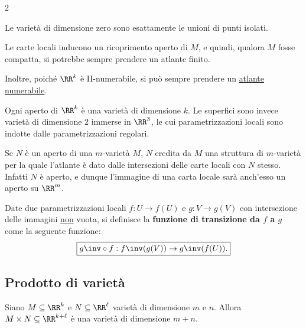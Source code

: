 \begin{multicols*}{2}
    \begin{remark}
        Le varietà di dimensione zero sono esattamente le unioni di punti isolati.
    \end{remark}

    \begin{remark}
        Le carte locali inducono un ricoprimento aperto di $M$, e quindi, qualora $M$ fosse compatta, si potrebbe
        sempre prendere un atlante finito. \smallskip

        Inoltre, poiché $\RR^k$ è II-numerabile, si può sempre prendere un \underline{atlante numerabile}.
    \end{remark}

    \begin{remark}
        Ogni aperto di $\RR^k$ è una varietà di dimensione $k$. Le superfici sono invece varietà
        di dimensione $2$ immerse in $\RR^3$, le cui parametrizzazioni locali sono indotte dalle parametrizzazioni
        regolari.
    \end{remark}

    \begin{remark} \label{rmk:aperti_di_varietà_sono_varietà}
        Se $N$ è un aperto di una $m$-varietà $M$, $N$ eredita da $M$ una
        struttura di $m$-varietà per la quale l'atlante è dato dalle intersezioni
        delle carte locali con $N$ stesso. Infatti $N$ è aperto, e dunque
        l'immagine di una carta locale sarà anch'esso un aperto su $\RR^m$.
    \end{remark}

    \begin{definition}
        Date due parametrizzazioni locali $f : U \to f(U)$ e $g : V \to g(V)$ con intersezione
        delle immagini \underline{non} vuota, si
        definisce la \textbf{funzione di transizione da $f$ a $g$} come la seguente funzione:
        \[ \boxed{g\inv \circ f : f\inv(g(V)) \to g\inv(f(U)).} \]
    \end{definition}

    \subsection{Prodotto di varietà}

    \begin{proposition} \label{prop:prodotto_varietà}
        Siano $M \subseteq \RR^k$ e $N \subseteq \RR^\ell$ varietà di dimensione
        $m$ e $n$. Allora $M \times N \subseteq \RR^{k+\ell}$ è una varietà
        di dimensione $m + n$. \smallskip


\end{proposition}
\end{multicols*}
